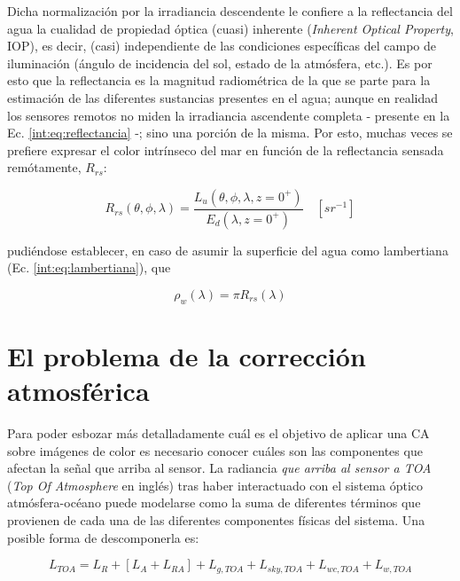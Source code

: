         Dicha normalización por la irradiancia descendente le confiere a la reflectancia del agua la cualidad de propiedad óptica (cuasi) inherente (\textit{Inherent Optical Property}, IOP), es decir, (casi) independiente de las condiciones específicas del campo de iluminación (ángulo de incidencia del sol, estado de la atmósfera, etc.). Es por esto que la reflectancia es la magnitud radiométrica de la que se parte para la estimación de las diferentes sustancias presentes en el agua; aunque en realidad los sensores remotos no miden la irradiancia ascendente completa - presente en la Ec. \ref{int:eq:reflectancia} -; sino una porción de la misma. Por esto, muchas veces se prefiere expresar el color intrínseco del mar en función de la reflectancia sensada remótamente, $R_{rs}$:
        
        \begin{equation}
        R_{rs}(\theta,\phi,\lambda)=\frac{L_{u}(\theta,\phi,\lambda,z=0^{+})}{E_{d}(\lambda,z=0^{+})} \quad [sr^{-1}]
        \label{int:eq:rrs}
        \end{equation}
        
        \noindent pudiéndose establecer, en caso de asumir la superficie del agua como lambertiana (Ec. \ref{int:eq:lambertiana}), que

        \begin{equation}
        \rho_{w}(\lambda)=\pi R_{rs}(\lambda)
        \label{int:eq:rrsVsRho}
        \end{equation}

\section{El problema de la corrección atmosférica}
\label{int:s:componentes}
    
    Para poder esbozar más detalladamente cuál es el objetivo de aplicar una CA sobre imágenes de color es necesario conocer cuáles son las componentes que afectan la señal que arriba al sensor. La radiancia \textit{que arriba al sensor a TOA} (\textit{Top Of Atmosphere} en inglés) tras haber interactuado con el sistema óptico atmósfera-océano puede modelarse como la suma de diferentes términos que provienen de cada una de las diferentes componentes físicas del sistema. Una posible forma de descomponerla es:
    
    \begin{equation}
        L_{TOA} = L_{R} + [L_{A}+L_{RA}] + L_{g,TOA} + L_{sky,TOA} + L_{wc,TOA} + L_{w,TOA}
        \label{int:eq:ltoa}
    \end{equation}

